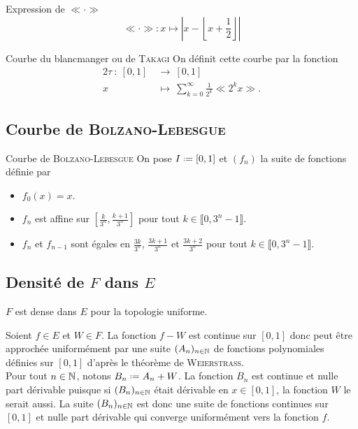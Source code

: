\begin{prop}{Expression de $\ll \cdot \gg$}
$$\ll \cdot \gg : x \mapsto \left| x - \left\lfloor x + \frac{1}{2} \right\rfloor \right|$$
\end{prop}

\begin{preuve}
    
\end{preuve}

\begin{defi}{Courbe du blancmanger ou de \textsc{Takagi}}
On définit cette courbe par la fonction
    \begin{alignat*}{2}
        \tau\ :\ [0,1]\ &\longrightarrow\ [0,1]\\
        x\ &\longmapsto\ \sum\limits_{k=0}^\infty \frac{1}{2^k} \ll 2^k x \gg.
    \end{alignat*}
\end{defi}

\subsection{Courbe de \textsc{Bolzano}-\textsc{Lebesgue}}    

\begin{defi}{Courbe de \textsc{Bolzano}-\textsc{Lebesgue}}
    On pose $I \defeq [0, 1]$ et $(f_n)$ la suite de fonctions définie par
    \begin{itemize}
        \item $f_0(x) = x.$
        \item $f_n$ est affine sur $\left[ \frac{k}{3^n}, \frac{k+1}{3^n} \right]$ pour tout $k \in \llbracket 0, 3^n - 1 \rrbracket$.
        \item $f_n$ et $f_{n-1}$ sont égales en $\frac{3k}{3^n}$, $\frac{3k+1}{3^n}$ et $\frac{3k+2}{3^n}$ pour tout $k \in \llbracket 0, 3^n-1 \rrbracket$.
    \end{itemize}
\end{defi}

\subsection{Densité de $F$ dans $E$}

\begin{theo}{}
    $F$ est dense dans $E$ pour la topologie uniforme.
\end{theo}

\begin{preuve}
    Soient $f \in E$ et $W \in F$. La fonction $f - W$ est continue sur $[0, 1]$ donc peut être approchée uniformément par une suite $(A_n)_{n \in \mathbb{N}}$ de fonctions polynomiales définies sur $[0, 1]$ d'après le théorème de \textsc{Weierstrass}. \\
    Pour tout $n \in \mathbb{N}$, notons $B_n \defeq A_n + W$. La fonction $B_n$ est continue et nulle part dérivable puisque si $(B_n)_{n \in \mathbb{N}}$ était dérivable en $x \in [0, 1]$, la fonction $W$ le serait aussi. La suite $(B_n)_{n \in \mathbb{N}}$ est donc une suite de fonctions continues sur $[0,1]$ et nulle part dérivable qui converge uniformément vers la fonction $f$.
\end{preuve}

